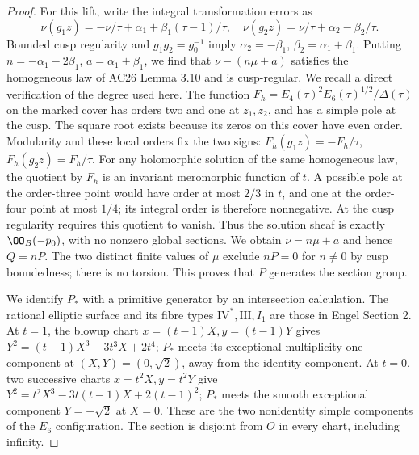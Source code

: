 \begin{proof}
For this lift, write the integral transformation errors as
\[
\nu(g_1z)=-\nu/\tau+\alpha_1+\beta_1(\tau-1)/\tau,
\quad
\nu(g_2z)=\nu/\tau+\alpha_2-\beta_2/\tau.
\]
Bounded cusp regularity and $g_1g_2=g_0^{-1}$ imply
$\alpha_2=-\beta_1$, $\beta_2=\alpha_1+\beta_1$.
Putting $n=-\alpha_1-2\beta_1$, $a=\alpha_1+\beta_1$, we find that
$\nu-(n\mu+a)$ satisfies the homogeneous law of AC26 Lemma 3.10
and is cusp-regular.  We recall a direct verification of the degree
used here.  The function
$F_h=E_4(\tau)^2E_6(\tau)^{1/2}/\Delta(\tau)$ on the marked cover
has orders two and one at $z_1,z_2$, and has a simple pole at the
cusp.  The square root exists because its zeros on this cover have
even order.  Modularity and these local orders fix the two signs:
$F_h(g_1z)=-F_h/\tau$, $F_h(g_2z)=F_h/\tau$.
For any holomorphic solution of the same homogeneous law, the
quotient by $F_h$ is an invariant meromorphic function of $t$.
A possible pole at the order-three point would have order at most
$2/3$ in $t$, and one at the order-four point at most $1/4$; its
integral order is therefore nonnegative.  At the cusp regularity
requires this quotient to vanish.  Thus the solution sheaf is
exactly $\OO_B(-p_0)$, with no nonzero global sections.
We obtain $\nu=n\mu+a$ and hence $Q=nP$.  The two distinct
finite values of $\mu$ exclude $nP=0$ for $n\ne0$ by cusp boundedness;
there is no torsion.  This proves that $P$ generates the section group.

We identify $P_*$ with a primitive generator by an intersection
calculation.  The rational elliptic surface and its fibre types
$\mathrm{IV}^*,\mathrm{III},I_1$ are those in Engel Section 2.
At $t=1$, the blowup chart $x=(t-1)X,y=(t-1)Y$ gives
$Y^2=(t-1)X^3-3t^3X+2t^4$; $P_*$ meets its exceptional
multiplicity-one component at $(X,Y)=(0,\sqrt2)$, away from the
identity component.  At $t=0$, two successive charts
$x=t^2X,y=t^2Y$ give
$Y^2=t^2X^3-3t(t-1)X+2(t-1)^2$; $P_*$ meets the smooth exceptional
component $Y=-\sqrt2$ at $X=0$.  These are the two nonidentity
simple components of the $E_6$ configuration.  The section is
disjoint from $O$ in every chart, including infinity.


\end{proof}
